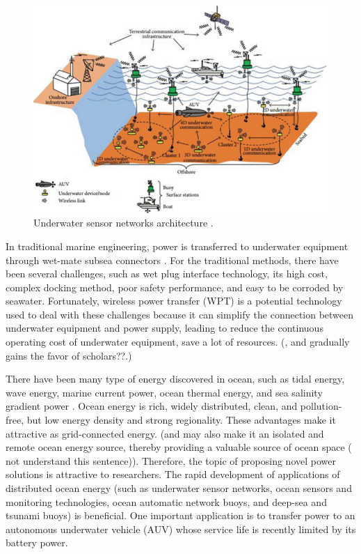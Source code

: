\begin{figure}[!t]
    \centering
    \includegraphics[width=0.7\linewidth]{images/1_underwater_sensor_networks.png}
    \caption{Underwater sensor networks architecture \cite{Nayyar}.}
    \label{fig:underwater sensor networks}
\end{figure}

In traditional marine engineering, power is transferred to underwater equipment through wet-mate subsea connectors \cite{Wang2016}. 
For the traditional methods, there have been several challenges, such as wet plug interface technology, its high cost, complex docking method, poor safety performance, and easy to be corroded by seawater. 
Fortunately, wireless power transfer (WPT) is a potential technology used to deal with these challenges because it can simplify the connection between underwater equipment and power supply, leading to reduce the continuous operating cost of underwater equipment, save a lot of resources. (, and gradually gains the favor of scholars??.)

There have been many type of energy discovered in ocean, such as tidal energy, wave energy, marine current power, ocean thermal energy, and sea salinity gradient power \cite{Capareda2019, Drew2009, Vlachogiannis2014, Zeng2020}. 
Ocean energy is rich, widely distributed, clean, and pollution-free, but low energy density and strong regionality. 
These advantages make it attractive as grid-connected energy.
(and may also make it an isolated and remote ocean energy source, thereby providing a valuable source of ocean space ({\color{red} not understand this sentence})). 
Therefore, the topic of proposing novel power solutions is attractive to researchers. 
The rapid development of applications of distributed ocean energy (such as underwater sensor networks, ocean sensors and monitoring technologies, ocean automatic network buoys, and deep-sea and tsunami buoys) is beneficial. 
One important application is to transfer power to an autonomous underwater vehicle (AUV) whose service life is recently limited by its battery power.


